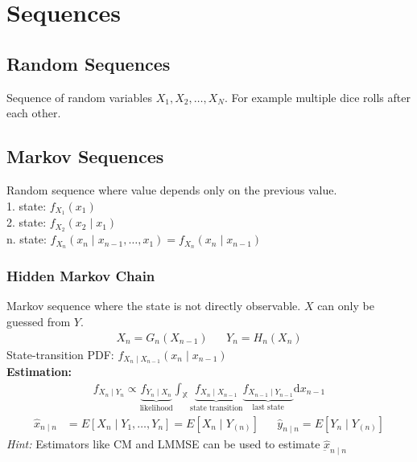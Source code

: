 \section{Sequences}
\begin{mdframed}[style=eqbox]
  \subsection{Random Sequences}
  Sequence of random variables $X_1, X_2, \ldots, X_N$. For example multiple dice rolls after each other.
  \subsection{Markov Sequences}
  Random sequence where value depends only on the previous value.\\
  1. state: $f_{X_1}(x_1)$\\
  2. state: $f_{X_2}(x_2 \mid x_1)$\\
  n. state: $f_{X_n}(x_n \mid x_{n-1}, \ldots, x_1) = f_{X_n}(x_n \mid x_{n-1})$
  \subsubsection{Hidden Markov Chain}
  Markov sequence where the state is not directly observable. $X$ can only be guessed from $Y$.
  \vspace*{-4pt}
  \begin{align*}
    X_n = G_n(X_{n-1}) && Y_n = H_n(X_n)
  \end{align*}
  State-transition PDF: $f_{X_n\mid X_{n-1}}(x_n \mid x_{n-1})$\\[0.25em]
  \textbf{Estimation:}
  \vspace*{-4pt}
  \begin{align*}
    f_{X_n \mid Y_n} \propto \underbrace{f_{Y_n \mid X_n}}_{\text{likelihood}} \int_{\mathbb{X}} \underbrace{f_{X_n \mid X_{n-1}}}_{\text{state transition}} \underbrace{f_{X_{n-1} \mid Y_{n-1}}}_{\text{last state}} \text{d}x_{n-1}
  \end{align*}\vspace*{-16pt}
  \begin{align*}
    \hat{x}_{n \mid n} &= E[X_n \mid Y_1, \ldots, Y_n] = E[X_n \mid Y_{(n)}] && \hat{y}_{n \mid n} = E[Y_n \mid Y_{(n)}]
  \end{align*}
  \textit{Hint:} Estimators like CM and LMMSE can be used to estimate $\hat{\underbar{x}}_{n \mid n}$
\end{mdframed}
